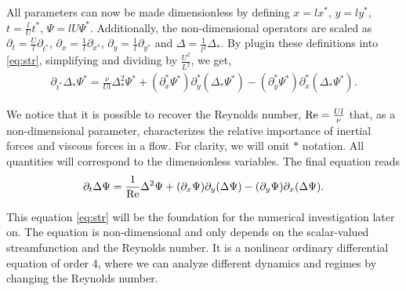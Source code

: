 All parameters can now be made dimensionless by defining $x = l x^*$, $y = l
y^*$, $t = \frac{l}{U} t^*$, $\Psi = lU \Psi^*$. Additionally, the
non-dimensional operators are scaled as $\partial_t = \frac{U}{l}
\partial_{t^*}$, $\partial_x = \frac{1}{l} \partial_{x^*}$, $\partial_y =
\frac{1}{l} \partial_{y^*}$ and $\Delta = \frac{1}{l^2} \Delta_{*}$. By
plugin these definitions into \eqref{eq:str}, simplifying and dividing by
$\frac{U^2}{L^2}$, we get,
\begin{align}
\partial_{t^*} \Delta_* \Psi^* = \frac{\nu}{Ul} \Delta^2_* \Psi^*
  + (\partial_x^* \Psi^*) \partial_y^*(\Delta_* \Psi^*)
  - (\partial_y^* \Psi^*) \partial_x^*(\Delta_* \Psi^*). 
\end{align}

We notice that it is possible to recover the Reynolds number, $\mathrm{Re} =
\frac{Ul}{\nu}$ that, as a non-dimensional parameter, characterizes the
relative importance of inertial forces and viscous forces in a flow. For
clarity, we will omit $*$ notation. All quantities will correspond to the
dimensionless variables. The final equation reads
\vspace{-5pt}
\begin{align}
\partial_t \Delta \Psi = \frac{1}{\mathrm{Re}} \Delta^2 \Psi
  + (\partial_x \Psi) \partial_y(\Delta \Psi)
  - (\partial_y \Psi) \partial_x(\Delta \Psi). \label{eq:str}
\end{align}

This equation \eqref{eq:str} will be the foundation for the numerical
investigation later on. The equation is non-dimensional and only depends on the
scalar-valued streamfunction and the Reynolds number. It is a nonlinear
ordinary differential equation of order 4, where we can analyze different
dynamics and regimes by changing the Reynolds number.

